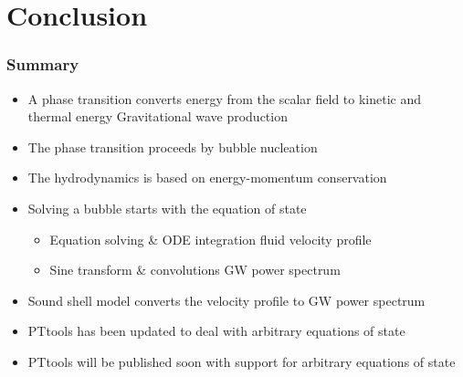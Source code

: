 \section{Conclusion}

\begin{frame}
    \frametitle{Summary}
    \begin{itemize}
        \item A phase transition converts energy from the scalar field to kinetic and thermal energy \textrightarrow Gravitational wave production
        \item The phase transition proceeds by bubble nucleation
        \item The hydrodynamics is based on energy-momentum conservation
        \item Solving a bubble starts with the equation of state
        \begin{itemize}
            \item Equation solving \& ODE integration \textrightarrow fluid velocity profile
            \item Sine transform \& convolutions \textrightarrow GW power spectrum
        \end{itemize}
        \item Sound shell model converts the velocity profile to GW power spectrum
        \item PTtools has been updated to deal with arbitrary equations of state
        \item PTtools will be published soon with support for arbitrary equations of state
    \end{itemize}
\end{frame}

